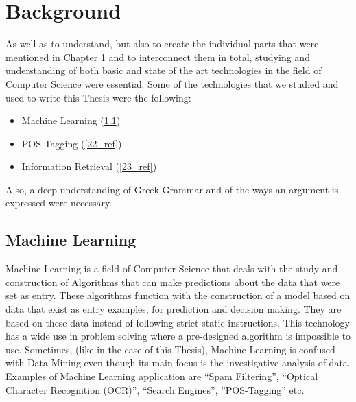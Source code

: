 \chapter{Background}
As well as to understand, but also to create the individual parts that were mentioned in Chapter 1 and to interconnect them in total, studying and understanding of both basic and state of the art technologies in the field of Computer Science were essential. Some of the technologies that we studied and used to write this Thesis were the following:\\
\begin{itemize}

	\item Machine Learning (\ref{21_ref})
	\item POS-Tagging (\ref{22_ref})
	\item Information Retrieval (\ref{23_ref})\\

\end{itemize}
Also, a deep understanding of Greek Grammar and of the ways an argument is expressed were necessary.

\section{Machine Learning}\label{21_ref}
Machine Learning is a field of Computer Science that deals with the study and construction of Algorithms that can make predictions about the data that were set as entry. These algorithms function with the construction of a model based on data that exist as entry examples, for prediction and decision making. They are based on these data instead of following strict static instructions. This technology has a wide use in problem solving where a pre-designed algorithm is impossible to use. Sometimes, (like in the case of this Thesis), Machine Learning is confused with Data Mining even though its main focus is the investigative analysis of data. Examples of Machine Learning application are ``Spam Filtering'', ``Optical Character Recognition (OCR)'', ``Search Engines'', ''POS-Tagging'' etc.

